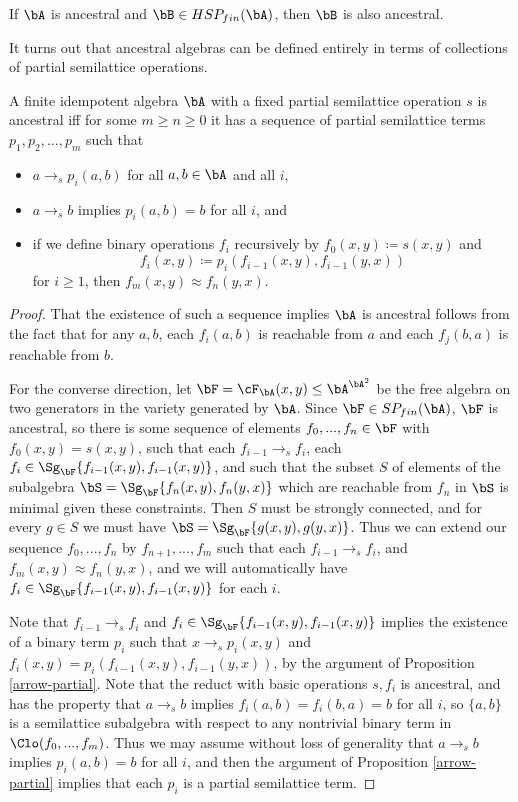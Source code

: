 \begin{cor} If $\bA$ is ancestral and $\bB \in HSP_{fin}(\bA)$, then $\bB$ is also ancestral.
\end{cor}

It turns out that ancestral algebras can be defined entirely in terms of collections of partial semilattice operations.

\begin{thm}\label{ancestral-terms} A finite idempotent algebra $\bA$ with a fixed partial semilattice operation $s$ is ancestral iff for some $m \ge n \ge 0$ it has a sequence of partial semilattice terms $p_1, p_2, ..., p_m$ such that
\begin{itemize}
\item $a \rightarrow_s p_i(a,b)$ for all $a,b \in \bA$ and all $i$,
\item $a \rightarrow_s b$ implies $p_i(a,b) = b$ for all $i$, and
\item if we define binary operations $f_i$ recursively by $f_0(x,y) \coloneqq s(x,y)$ and
\[
f_i(x,y) \coloneqq p_i(f_{i-1}(x,y),f_{i-1}(y,x))
\]
for $i \ge 1$, then $f_m(x,y) \approx f_n(y,x)$.
\end{itemize}
\end{thm}
\begin{proof} That the existence of such a sequence implies $\bA$ is ancestral follows from the fact that for any $a,b$, each $f_i(a,b)$ is reachable from $a$ and each $f_j(b,a)$ is reachable from $b$.

For the converse direction, let $\bF = \cF_{\bA}(x,y) \le \bA^{\bA^2}$ be the free algebra on two generators in the variety generated by $\bA$. Since $\bF \in SP_{fin}(\bA)$, $\bF$ is ancestral, so there is some sequence of elements $f_0, ..., f_n \in \bF$ with $f_0(x,y) = s(x,y)$, such that each $f_{i-1} \rightarrow_s f_i$, each $f_i \in \Sg_{\bF}\{f_{i-1}(x,y),f_{i-1}(x,y)\}$, and such that the subset $S$ of elements of the subalgebra $\bS = \Sg_{\bF}\{f_n(x,y),f_n(y,x)\}$ which are reachable from $f_n$ in $\bS$ is minimal given these constraints. Then $S$ must be strongly connected, and for every $g \in S$ we must have $\bS = \Sg_{\bF}\{g(x,y), g(y,x)\}$. Thus we can extend our sequence $f_0, ..., f_n$ by $f_{n+1}, ..., f_m$ such that each $f_{i-1} \rightarrow_s f_i$, and $f_m(x,y) \approx f_n(y,x)$, and we will automatically have $f_i \in \Sg_{\bF}\{f_{i-1}(x,y),f_{i-1}(x,y)\}$ for each $i$.

Note that $f_{i-1} \rightarrow_s f_i$ and $f_i \in \Sg_{\bF}\{f_{i-1}(x,y),f_{i-1}(x,y)\}$ implies the existence of a binary term $p_i$ such that $x \rightarrow_s p_i(x,y)$ and $f_i(x,y) = p_i(f_{i-1}(x,y), f_{i-1}(y,x))$, by the argument of Proposition \ref{arrow-partial}. Note that the reduct with basic operations $s, f_i$ is ancestral, and has the property that $a \rightarrow_s b$ implies $f_i(a,b) = f_i(b,a) = b$ for all $i$, so $\{a,b\}$ is a semilattice subalgebra with respect to any nontrivial binary term in $\Clo(f_0, ..., f_m)$. Thus we may assume without loss of generality that $a \rightarrow_s b$ implies $p_i(a,b) = b$ for all $i$, and then the argument of Proposition \ref{arrow-partial} implies that each $p_i$ is a partial semilattice term.
\end{proof}

